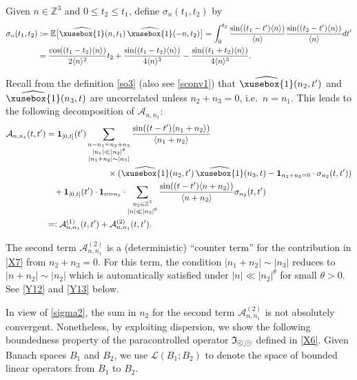 \documentclass[%
11pt,  reqno]{amsart}
\def\<#1>{\xusebox{#1}}
\newcommand{\pe}{\mathbin{\scaleobj{0.7}{\tikz \draw (0,0) node[shape=circle,draw,inner sep=0pt,minimum size=8.5pt] {\scriptsize  $=$};}}}
\newcommand{\pl}{\mathbin{\scaleobj{0.7}{\tikz \draw (0,0) node[shape=circle,draw,inner sep=0pt,minimum size=8.5pt] {\scriptsize $<$};}}}
\newcommand{\1}{\hspace{0.2mm}\text{I}\hspace{0.2mm}}
\newcommand{\noi}{\noindent}
\newcommand{\Z}{\mathbb{Z}}
\newcommand{\E}{\mathbb{E}}
\renewcommand{\L}{\mathcal{L}}
\newcommand{\s}{\sigma}
\newcommand{\ft}{\widehat}
\newcommand{\jb}[1]
{\langle #1 \rangle}
\newcommand{\ind}{\mathbf 1}
\newcommand{\If}{\mathfrak{I}}
\newcommand{\A}{\mathcal{A}}
\numberwithin{equation}{section}
\numberwithin{theorem}{section}
\begin{document}
Given $n \in \Z^3$ and  $0 \leq t_2\leq t_1$, 
define $\s_{n}(t_1, t_2 )$ by 
\begin{align}
\begin{split}
\s_{n}(t_1, t_2 )  & :=
\E  \big[  \ft{\<1>}(n, t_1)  \,  \ft{\<1>}(-n, t_2) \big]
  =
   \int_0^{t_2} \frac{\sin ((t_1 - t')\jb{n} )}{\jb{n}}
   \frac{\sin ((t_2 - t') \jb{n})}{\jb{n}} d t'\\
&  =    \frac{\cos((t_1 - t_2)\jb{n}) }{2 \jb{n}^2} t_2
+  \frac{\sin ((t_1-t_2)  \jb{n})}{4\jb{n}^3 }
-  \frac{\sin ((t_1 +  t_2) \jb{n})}{4\jb{n}^3 }.
\end{split}
\label{sigma2}
\end{align}

\noi
Recall from the definition \eqref{so3} (also see \eqref{sconv1})
that $\ft{\<1>}(n_2, t')$ and $\ft{\<1>}(n_3, t)$
are uncorrelated unless $n_2+ n_3 = 0$,
i.e.~$n = n_1$.
This leads to the following decomposition of $\A_{n, n_1}$:
\begin{align}
\begin{split}
\A_{n, n_1} (t, t')
& = \ind_{[0 , t]}(t') \sum_{\substack{n - n_1 =  n_2 + n_3\\ |n_1| \ll |n_2|^\theta \\ |n_1 + n_2|\sim |n_3|}}
 \frac{\sin ((t - t') \jb{ n_1 + n_2 })}{\jb{ n_1 + n_2 }} \\
& \hphantom{XXXXXXXX}
\times (   \ft{\<1>}(n_2, t') \, \ft{\<1>}(n_3, t) - \ind_{n_2 + n_3 = 0} \cdot \s_{n_2}(t, t')) \\
& \hphantom{X}
+ \ind_{[0 , t]}(t') \cdot \ind_{n=n_1}\cdot \sum_{\substack{n_2 \in \Z^3 \\ |n| \ll |n_2|^\theta}}
 \frac{\sin ((t - t') \jb{n + n_2 })}{\jb{ n + n_2} } 
 \s_{n_2}(t, t') \\
& = :
\A^{(1)}_{n, n_1} (t, t')+    \A^{(2)}_{n, n_1} (t, t').
\end{split}
\label{X9}
\end{align}


\noi
The second term $\A^{(2)}_{n, n_1}$ is a (deterministic) ``counter term''
for the contribution in \eqref{X7} from $n_2 + n_3 = 0$.
For this term,  the condition $|n_1 + n_2|\sim |n_3|$
reduces to $|n + n_2|\sim |n_2|$ which is automatically satisfied
under $|n| \ll |n_2|^\theta$ for small $\theta > 0$.
See \eqref{Y12} and \eqref{Y13} below.

In view of \eqref{sigma2}, 
 the sum in $n_2$ for the second term $\A^{(2)}_{n, n_1}$ is not absolutely convergent.
Nonetheless, 
by  exploiting dispersion, 
we  
show the following boundedness
property
of the paracontrolled operator $\If_{\pl, \pe}$ defined in \eqref{X6}.
 Given Banach spaces $B_1$ and $B_2$, 
 we use $\L(B_1; B_2)$ to denote the space
 of bounded linear operators from $B_1$ to $B_2$.
\end{document}
